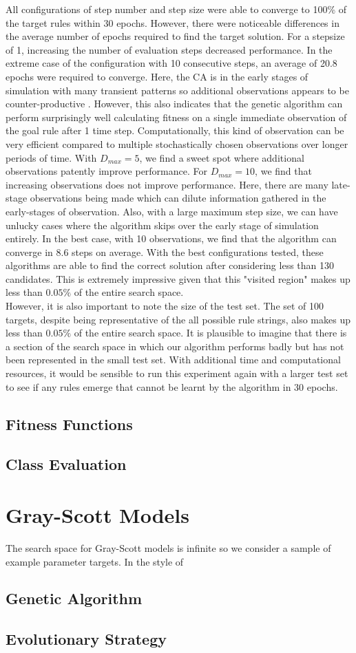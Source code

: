 All configurations of step number and step size were able to converge to 100\% of the target rules within 30 epochs. However, there were noticeable differences in the average number of epochs required to find the target solution. For a stepsize of 1, increasing the number of evaluation steps decreased performance. In the extreme case of the configuration with 10 consecutive steps, an average of 20.8 epochs were required to converge. Here, the CA is in the early stages of simulation with many transient patterns so additional observations appears to be counter-productive . However, this also indicates that the genetic algorithm can perform surprisingly well calculating fitness on a single immediate observation of the goal rule after 1 time step. Computationally, this kind of observation can be very efficient compared to multiple stochastically chosen observations over longer periods of time. With $D_{max} = 5$, we find a sweet spot where additional observations patently improve performance. For $D_{max}=10$, we find that increasing observations does not improve performance. Here, there are many late-stage observations being made which can dilute information gathered in the early-stages of observation. Also, with a large maximum step size, we can have unlucky cases where the algorithm skips over the early stage of simulation entirely. In the best case, with 10 observations, we find that the algorithm can converge in 8.6 steps on average. With the best configurations tested, these algorithms are able to find the correct solution after considering less than 130 candidates. This is extremely impressive given that this "visited region" makes up less than $0.05\%$ of the entire search space.\\

However, it is also important to note the size of the test set. The set of 100 targets, despite being representative of the all possible rule strings, also makes up less than $0.05\%$ of the entire search space. It is plausible to imagine that there is a section of the search space in which our algorithm performs badly but has not been represented in the small test set. With additional time and computational resources, it would be sensible to run this experiment again with a larger test set to see if any rules emerge that cannot be learnt by the algorithm in 30 epochs.

\subsection{Fitness Functions}


\subsection{Class Evaluation}


\section{Gray-Scott Models}

The search space for Gray-Scott models is infinite so we consider a sample of example parameter targets. In the style of 

\subsection{Genetic Algorithm}


\subsection{Evolutionary Strategy}